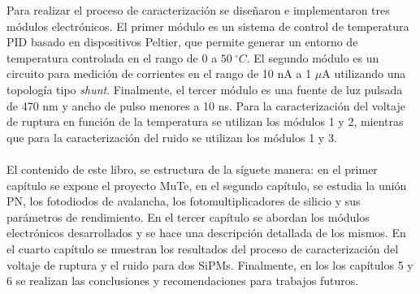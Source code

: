 Para realizar el proceso de caracterización se diseñaron e implementaron tres módulos electrónicos. El primer módulo es un sistema de control de temperatura PID basado en dispositivos Peltier, que permite generar un entorno de temperatura controlada en el rango de $0$ a $50~^\circ C$. El segundo módulo es un circuito para  medición de corrientes en el rango de 10 nA a 1 $\mu$A utilizando una topología tipo \textit{shunt}. Finalmente, el tercer módulo es una fuente de luz pulsada de 470 nm y ancho de pulso menores a 10 ns. Para la caracterización del voltaje de ruptura en función de la temperatura se utilizan los módulos 1 y 2, mientras que para la caracterización del ruido se utilizan los módulos 1 y 3.\\ \\
El contenido de este libro, se estructura de la síguete manera: en el primer capítulo se expone el proyecto MuTe, en el segundo capítulo, se estudia la unión PN, los fotodiodos de  avalancha, los fotomultiplicadores de silicio y sus parámetros de rendimiento. En el tercer capítulo se abordan los módulos electrónicos desarrollados y se hace una descripción detallada de los mismos. En el cuarto capítulo se muestran los resultados del proceso de caracterización del voltaje de ruptura y el ruido para dos SiPMs. Finalmente, en los los capítulos 5 y 6 se realizan las conclusiones y recomendaciones para trabajos futuros.   


